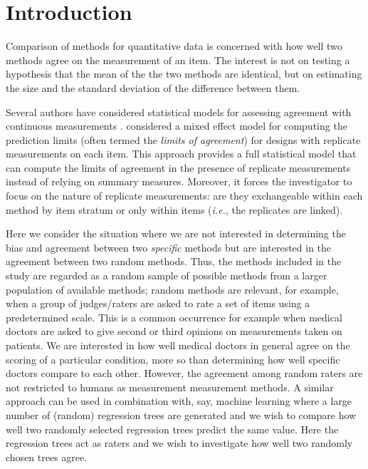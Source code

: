 \documentclass[aoas]{imsart}
\makeatletter
\newcommand{\ie}{\emph{i.e.}\@\xspace}
\makeatother
\begin{document}


\section{Introduction}
Comparison of methods for quantitative data is concerned with how well
two methods agree on the measurement of an item. The interest is not
on testing a hypothesis that the mean of the the two methods are
identical, but on estimating the size and the standard deviation of
the difference between them.

Several authors have considered statistical models for assessing
agreement with continuous measurements
\citep{Barnhart2007,Rousson2002,BlanAltm:2007}.
\citet{Carstensen.2008b} considered a mixed effect model for computing
the prediction limits (often termed the \emph{limits of agreement})
for designs with replicate measurements on each item. This approach
provides a full statistical model that can compute the limits of
agreement in the presence of replicate measurements instead of relying
on summary measures. Moreover, it forces the investigator to focus on
the nature of replicate measurements: are they exchangeable within
each method by item stratum or only within items (\ie, the replicates
are linked).

Here we consider the situation where we are not interested in
determining the bias and agreement between two \emph{specific} methods
but are interested in the agreement between two random methods. Thus,
the methods included in the study are regarded as a random sample of
possible methods from a larger population of available methods; random
methods are relevant, for example, when a group of judges/raters are
asked to rate a set of items using a predetermined scale. This is a
common occurrence for example when medical doctors are asked to give
second or third opinions on measurements taken on patients. We are
interested in how well medical doctors in general agree on the scoring
of a particular condition, more so than determining how well specific
doctors compare to each other. However, the agreement among random
raters are not restricted to humans as measurement measurement
methods. A similar approach can be used in combination with, say,
machine learning where a large number of (random) regression trees
are generated and we wish to compare how well two randomly selected
regression trees predict the same value. Here the regression trees act
as raters and we wish to investigate how well two randomly chosen trees agree.
\end{document}
